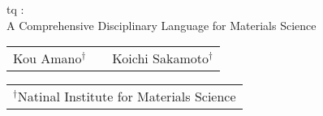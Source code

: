 \documentclass[portrait,a0,oldgerm]{a0poster}
\def\areaspace{9.4mm}
\begin{document}

\begin{center}
\vspace{25mm}
\end{center}
\begin{center}
\color[cmyk]{0,1,1,0.9}
\linespread{5.0}\fontsize{90}{20}\selectfont
tq :\\A Comprehensive Disciplinary Language for Materials Science
\end{center}
\vspace{20mm}
\color[cmyk]{0,1,1,0.85}
\linespread{1.4}\fontsize{50}{20}\selectfont
\begin{center} \begin{tabular}[t]{ccc}
Kou Amano$^{\dag}$ &&Koichi Sakamoto$^{\dag}$ \\
\end{tabular} \end{center}
\color[cmyk]{0,1,1,0.82}
\linespread{1.4}\fontsize{48}{20}\selectfont
\begin{center} \begin{tabular}{c} 
$^\dag$Natinal Institute for Materials Science \\
\end{tabular} \end{center}
\vspace{25mm}


\vspace{25mm}
\color[cmyk]{1,1,0,0.8}
\begin{multicols}{3}
\noindent 
\vspace{\areaspace} \noindent 

\noindent 
\vspace{\areaspace} \noindent 

\noindent 
\vspace{\areaspace} \noindent 
\end{multicols}
\end{document}
